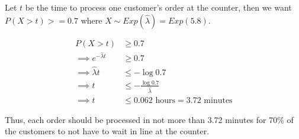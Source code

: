 \documentclass[12pt, oneside]{article}
\begin{document}
\begin{enumerate}
{  Let \(t\) be the time to process one customer's order at the counter, then we want
  \(P(X > t) >= 0.7\) where \(X \sim Exp(\widehat{\lambda}) = Exp(5.8)\).

  \begin{align*}
    P(X > t) &\geq 0.7 \\
    \implies e^{-\widehat{\lambda} t} &\geq 0.7 \\
    \implies \widehat{\lambda} t &\leq -\log{0.7} \\
    \implies t &\leq -\frac{\log{0.7}}{\widehat{\lambda}} \\
    \implies t &\leq 0.062 \text{ hours} = 3.72 \text{ minutes}
  \end{align*}

  Thus, each order should be processed in not more than 3.72 minutes for 70\% of the
  customers to not have to wait in line at the counter.
}


\end{enumerate}
\end{document}

